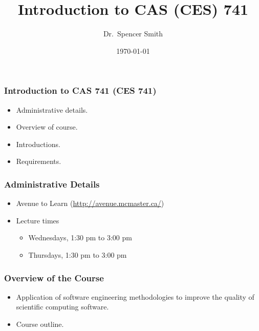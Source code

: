 \documentclass[13pt]{beamer} %
\title[Intro.~and Req.~Doc. (slide \thepage)]{Introduction to CAS (CES) 741}
\author[Smith]{Dr.~Spencer Smith}
\institute{Computing and Software Department, McMaster University}
\date{\today}
\begin{document}
\maketitle


\begin{frame}
\frametitle{Introduction to CAS 741 (CES 741)}
\begin{itemize}
\item Administrative details.
\item Overview of course.
\item Introductions.
\item Requirements.
\end{itemize}
\end{frame}


\begin{frame}
\frametitle{Administrative Details}

\begin{itemize}

\item Avenue to Learn (\url{http://avenue.mcmaster.ca/})
\item Lecture times
\begin{itemize}
\item Wednesdays, 1:30 pm to 3:00 pm
\item Thursdays, 1:30 pm to 3:00 pm
\end{itemize}
\end{itemize}

\end{frame}


\begin{frame}
\frametitle{Overview of the Course}

\begin{itemize}

\item Application of software engineering methodologies to improve the quality of scientific computing software.
\item Course outline.

\end{itemize}

\end{frame}
\end{document}
